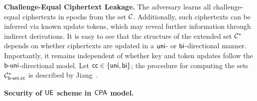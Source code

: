 \documentclass{fundam}
\begin{document}
\vspace{0.3cm}
\noindent\textbf{Challenge-Equal Ciphertext Leakage.} The adversary learns all challenge-equal ciphertexts in epochs from the set $\mathcal{C}$. Additionally, such ciphertexts can be inferred via known update tokens, which may reveal further information through indirect derivations.
It is easy to see that the structure of the extended set $\mathcal{C}^{*}$ depends on whether ciphertexts are updated in a $\mathsf{uni}$- or $\mathsf{bi}$-directional manner. Importantly, it remains independent of whether key and token updates follow the $\mathsf{b}{\text{-}}\mathsf{uni}$-directional model. Let $\mathsf{cc} \in \{\mathsf{uni}, \mathsf{bi}\}$; the procedure for computing the sets $\mathcal{C}_{\mathsf{b}{\text{-}}\mathsf{uni}, \mathsf{cc}}^{*}$ is described by Jiang~\cite{jiang2020}.


\vspace{0.3cm}
\noindent\textbf{Security of $\mathsf{UE}$ scheme in $\mathsf{CPA}$ model.}

\vspace{0.5cm}
\begin{pchstack}[center]
	
	\pchspace
	
	\hspace{2cm}
	
	\pchspace
\end{pchstack}

\vspace{0.5cm}
\end{document}
